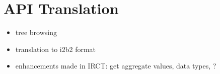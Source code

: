 \section{API Translation}



\begin{itemize}
    \item tree browsing
    \item translation to i2b2 format
    \item enhancements made in IRCT: get aggregate values, data types, ?
\end{itemize}






